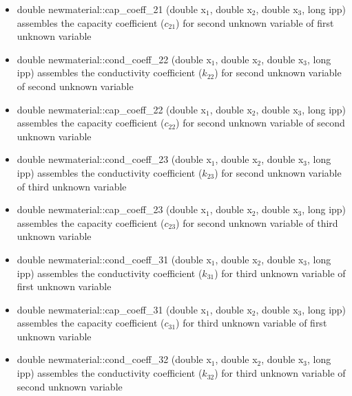 \begin{itemize}
\item{
{\sf double newmaterial::cap\_coeff\_21 (double x$_1$, double x$_2$, double x$_3$, long ipp)}
\newline assembles the capacity coefficient ($c_{21}$) for second unknown variable of first unknown variable
}

\item{
{\sf double newmaterial::cond\_coeff\_22 (double x$_1$, double x$_2$, double x$_3$, long ipp)}
\newline assembles the conductivity coefficient ($k_{22}$) for second unknown variable of second unknown variable
}

\item{
{\sf double newmaterial::cap\_coeff\_22 (double x$_1$, double x$_2$, double x$_3$, long ipp)}
\newline assembles the capacity coefficient ($c_{22}$) for second unknown variable of second unknown variable
}

\item{
{\sf double newmaterial::cond\_coeff\_23 (double x$_1$, double x$_2$, double x$_3$, long ipp)}
\newline assembles the conductivity coefficient ($k_{23}$) for second unknown variable of third unknown variable
}

\item{
{\sf double newmaterial::cap\_coeff\_23 (double x$_1$, double x$_2$, double x$_3$, long ipp)}
\newline assembles the capacity coefficient ($c_{23}$) for second unknown variable of third unknown variable
}



\item{
{\sf double newmaterial::cond\_coeff\_31 (double x$_1$, double x$_2$, double x$_3$, long ipp)}
\newline assembles the conductivity coefficient ($k_{31}$) for third unknown variable of first unknown variable
}

\item{
{\sf double newmaterial::cap\_coeff\_31 (double x$_1$, double x$_2$, double x$_3$, long ipp)}
\newline assembles the capacity coefficient ($c_{31}$) for third unknown variable of first unknown variable
}

\item{
{\sf double newmaterial::cond\_coeff\_32 (double x$_1$, double x$_2$, double x$_3$, long ipp)}
\newline assembles the conductivity coefficient ($k_{32}$) for third unknown variable of second unknown variable
}


\end{itemize}
